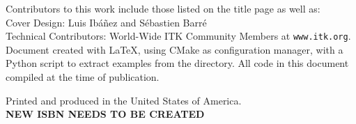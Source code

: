 \begin{minipage}[t][2.7cm][b]{\textwidth}
\begin{center}

Contributors to this work include those listed on the title page as well
as:\\ Cover Design: Luis Ib\'{a}\~{n}ez and S\'{e}bastien Barr\'{e}\\
Technical Contributors: World-Wide ITK Community Members at
\texttt{www.itk.org}. \\Document created with \LaTeX{}, using CMake as
configuration manager, with a Python script to extract examples from the
 directory. All code in this document compiled at
the time of publication.
\end{center}
\end{minipage}


\begin{minipage}[t][1.0cm][b]{\textwidth}
\begin{center}
Printed and produced in the United States of America.\\
\bf{NEW ISBN NEEDS TO BE CREATED}
\end{center}
\end{minipage}
